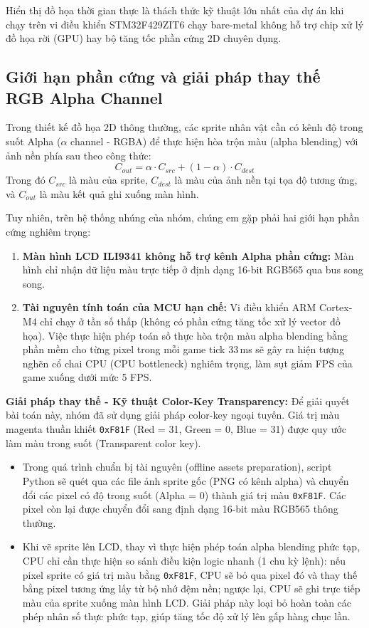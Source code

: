\documentclass[a4paper,12pt]{report}
\begin{document}
Hiển thị đồ họa thời gian thực là thách thức kỹ thuật lớn nhất của dự án khi chạy trên vi điều khiển STM32F429ZIT6 chạy bare-metal không hỗ trợ chip xử lý đồ họa rời (GPU) hay bộ tăng tốc phần cứng 2D chuyên dụng. 

\subsection{Giới hạn phần cứng và giải pháp thay thế RGB Alpha Channel}

Trong thiết kế đồ họa 2D thông thường, các sprite nhân vật cần có kênh độ trong suốt Alpha ($\alpha$ channel - RGBA) để thực hiện hòa trộn màu (alpha blending) với ảnh nền phía sau theo công thức:
\[
C_{out} = \alpha \cdot C_{src} + (1 - \alpha) \cdot C_{dest}
\]
Trong đó $C_{src}$ là màu của sprite, $C_{dest}$ là màu của ảnh nền tại tọa độ tương ứng, và $C_{out}$ là màu kết quả ghi xuống màn hình.

Tuy nhiên, trên hệ thống nhúng của nhóm, chúng em gặp phải hai giới hạn phần cứng nghiêm trọng:
\begin{enumerate}
    \item \textbf{Màn hình LCD ILI9341 không hỗ trợ kênh Alpha phần cứng:} Màn hình chỉ nhận dữ liệu màu trực tiếp ở định dạng 16-bit RGB565 qua bus song song.
    \item \textbf{Tài nguyên tính toán của MCU hạn chế:} Vi điều khiển ARM Cortex-M4 chỉ chạy ở tần số thấp (không có phần cứng tăng tốc xử lý vector đồ họa). Việc thực hiện phép toán số thực hòa trộn màu alpha blending bằng phần mềm cho từng pixel trong mỗi game tick 33\,ms sẽ gây ra hiện tượng nghẽn cổ chai CPU (CPU bottleneck) nghiêm trọng, làm sụt giảm FPS của game xuống dưới mức 5 FPS.
\end{enumerate}

\noindent \textbf{Giải pháp thay thế - Kỹ thuật Color-Key Transparency:}
Để giải quyết bài toán này, nhóm đã sử dụng giải pháp color-key ngoại tuyến. Giá trị màu magenta thuần khiết \texttt{0xF81F} (Red = 31, Green = 0, Blue = 31) được quy ước làm màu trong suốt (Transparent color key).
\begin{itemize}
    \item Trong quá trình chuẩn bị tài nguyên (offline assets preparation), script Python sẽ quét qua các file ảnh sprite gốc (PNG có kênh alpha) và chuyển đổi các pixel có độ trong suốt (Alpha = 0) thành giá trị màu \texttt{0xF81F}. Các pixel còn lại được chuyển đổi sang định dạng 16-bit màu RGB565 thông thường.
    \item Khi vẽ sprite lên LCD, thay vì thực hiện phép toán alpha blending phức tạp, CPU chỉ cần thực hiện so sánh điều kiện logic nhanh (1 chu kỳ lệnh): nếu pixel sprite có giá trị màu bằng \texttt{0xF81F}, CPU sẽ bỏ qua pixel đó và thay thế bằng pixel tương ứng lấy từ bộ nhớ đệm nền; ngược lại, CPU sẽ ghi trực tiếp màu của sprite xuống màn hình LCD. Giải pháp này loại bỏ hoàn toàn các phép nhân số thực phức tạp, giúp tăng tốc độ xử lý lên gấp hàng chục lần.
\end{itemize}
\end{document}

